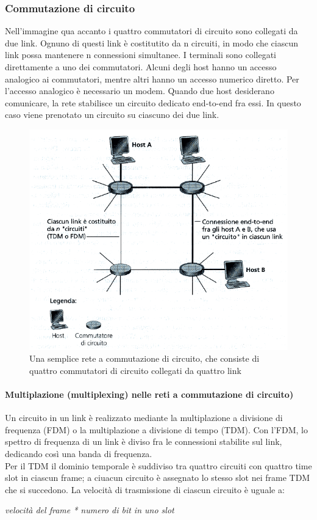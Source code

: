 \documentclass[11pt,a4paper]{article}
\begin{document}
\subsubsection{Commutazione di circuito} \label{par: TDM/FDM}
Nell’immagine qua accanto i quattro commutatori di circuito sono collegati da due link. Ognuno di questi link è costitutito da n circuiti, in modo che ciascun link possa mantenere n connessioni simultanee.
I terminali sono collegati direttamente a uno dei commutatori. Alcuni degli host hanno un accesso analogico ai commutatori, mentre altri hanno un accesso numerico diretto. Per l’accesso analogico è necessario un modem. Quando due host desiderano comunicare, la rete stabilisce un circuito dedicato end-to-end fra essi. In questo caso viene prenotato un circuito su ciascuno dei due link.
\begin{figure}
	\begin{center}
		\includegraphics[scale=0.6]{img/002.png}
		\caption{Una semplice rete a commutazione di circuito, che consiste di quattro commutatori di circuito collegati da quattro link}
	\end{center}
\end{figure}
\paragraph{Multiplazione (multiplexing) nelle reti a commutazione di circuito)} 
Un circuito in un link è realizzato mediante la multiplazione a divisione di frequenza (FDM) o la multiplazione a divisione di tempo (TDM).
Con l’FDM, lo spettro di frequenza di un link è diviso fra le connessioni stabilite sul link, dedicando così una banda di frequenza. \\
Per il TDM il dominio temporale è suddiviso tra quattro circuiti con quattro time slot in ciascun frame; a ciuacun circuito è assegnato lo stesso slot nei frame TDM che si succedono. La velocità di trasmissione di ciascun circuito è uguale a:
\begin{center}
	\textit{velocità del frame * numero di bit in uno slot}
\end{center}
\end{document}
